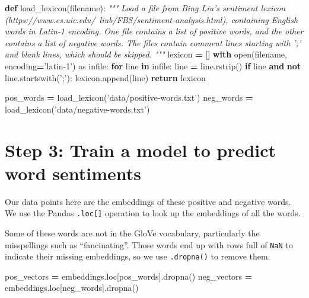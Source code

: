 \documentclass[]{book}
\newenvironment{Shaded}{\begin{snugshade}}{\end{snugshade}}
\newcommand{\KeywordTok}[1]{\textcolor[rgb]{0.13,0.29,0.53}{\textbf{#1}}}
\newcommand{\StringTok}[1]{\textcolor[rgb]{0.31,0.60,0.02}{#1}}
\newcommand{\ImportTok}[1]{#1}
\newcommand{\CommentTok}[1]{\textcolor[rgb]{0.56,0.35,0.01}{\textit{#1}}}
\newcommand{\ControlFlowTok}[1]{\textcolor[rgb]{0.13,0.29,0.53}{\textbf{#1}}}
\newcommand{\OperatorTok}[1]{\textcolor[rgb]{0.81,0.36,0.00}{\textbf{#1}}}
\newcommand{\BuiltInTok}[1]{#1}
\newcommand{\NormalTok}[1]{#1}
\theoremstyle{definition}
\theoremstyle{definition}
\theoremstyle{definition}
\theoremstyle{remark}
\begin{document}
\begin{Shaded}
\begin{Highlighting}[]
\KeywordTok{def}\NormalTok{ load_lexicon(filename):}
    \CommentTok{"""}
\CommentTok{    Load a file from Bing Liu's sentiment lexicon}
\CommentTok{    (https://www.cs.uic.edu/~liub/FBS/sentiment-analysis.html), containing}
\CommentTok{    English words in Latin-1 encoding.}
\CommentTok{    }
\CommentTok{    One file contains a list of positive words, and the other contains}
\CommentTok{    a list of negative words. The files contain comment lines starting}
\CommentTok{    with ';' and blank lines, which should be skipped.}
\CommentTok{    """}
\NormalTok{    lexicon }\OperatorTok{=}\NormalTok{ []}
    \ControlFlowTok{with} \BuiltInTok{open}\NormalTok{(filename, encoding}\OperatorTok{=}\StringTok{'latin-1'}\NormalTok{) }\ImportTok{as}\NormalTok{ infile:}
        \ControlFlowTok{for}\NormalTok{ line }\KeywordTok{in}\NormalTok{ infile:}
\NormalTok{            line }\OperatorTok{=}\NormalTok{ line.rstrip()}
            \ControlFlowTok{if}\NormalTok{ line }\KeywordTok{and} \KeywordTok{not}\NormalTok{ line.startswith(}\StringTok{';'}\NormalTok{):}
\NormalTok{                lexicon.append(line)}
    \ControlFlowTok{return}\NormalTok{ lexicon}

\NormalTok{pos_words }\OperatorTok{=}\NormalTok{ load_lexicon(}\StringTok{'data/positive-words.txt'}\NormalTok{)}
\NormalTok{neg_words }\OperatorTok{=}\NormalTok{ load_lexicon(}\StringTok{'data/negative-words.txt'}\NormalTok{)}
\end{Highlighting}
\end{Shaded}

\section{Step 3: Train a model to predict word
sentiments}\label{step-3-train-a-model-to-predict-word-sentiments}

Our data points here are the embeddings of these positive and negative
words. We use the Pandas \texttt{.loc{[}{]}} operation to look up the
embeddings of all the words.

Some of these words are not in the GloVe vocabulary, particularly the
misspellings such as ``fancinating''. Those words end up with rows full
of \texttt{NaN} to indicate their missing embeddings, so we use
\texttt{.dropna()} to remove them.

\begin{Shaded}
\begin{Highlighting}[]
\NormalTok{pos_vectors }\OperatorTok{=}\NormalTok{ embeddings.loc[pos_words].dropna()}
\NormalTok{neg_vectors }\OperatorTok{=}\NormalTok{ embeddings.loc[neg_words].dropna()}
\end{Highlighting}
\end{Shaded}
\end{document}
